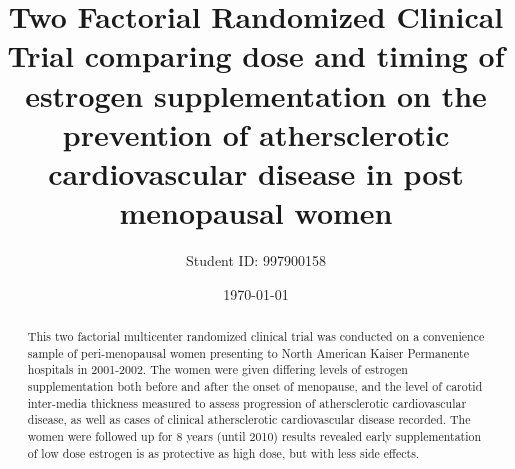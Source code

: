 \documentclass[11pt]{article}
\title{Two Factorial Randomized Clinical Trial comparing dose and timing of estrogen supplementation on the prevention of athersclerotic cardiovascular disease in post menopausal women}
\author{Student ID: 997900158}
\date{\today}
\begin{document}
	\maketitle
	\begin{abstract}
		This two factorial multicenter randomized clinical trial was conducted on a convenience sample of peri-menopausal women presenting to North American Kaiser Permanente hospitals in 2001-2002.
		The women were given differing levels of estrogen supplementation both before and after the onset of menopause, and the level of carotid inter-media thickness measured to assess progression of athersclerotic cardiovascular disease, as well as cases of clinical athersclerotic cardiovascular disease recorded.
		The women were followed up for 8 years (until 2010) results revealed early supplementation of low dose estrogen is as protective as high dose, but with less side effects.

	\end{abstract}

\onehalfspace
\end{document}
